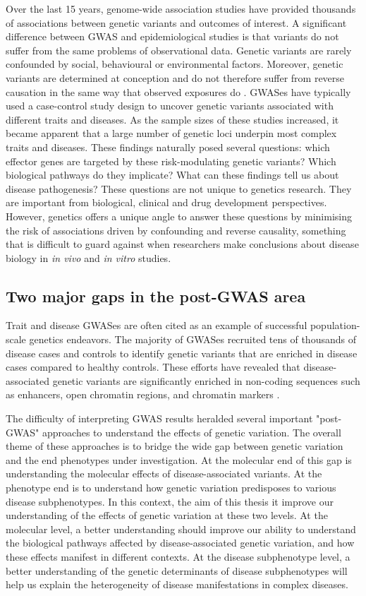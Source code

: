 Over the last 15 years, genome-wide association studies have provided thousands of associations between genetic variants and outcomes of interest. A significant difference between GWAS and epidemiological studies is that variants do not suffer from the same problems of observational data. Genetic variants are rarely confounded by social, behavioural or environmental factors. Moreover, genetic variants are determined at conception and do not therefore suffer from reverse causation in the same way that observed exposures do \cite{Smith2007-py}. GWASes have typically used a case-control study design to uncover genetic variants associated with different traits and diseases. As the sample sizes of these studies increased, it became apparent that a large number of genetic loci underpin most complex traits and diseases. These findings naturally posed several questions: which effector genes are targeted by these risk-modulating genetic variants? Which biological pathways do they implicate? What can these findings tell us about disease pathogenesis? These questions are not unique to genetics research. They are important from biological, clinical and drug development perspectives. However, genetics offers a unique angle to answer these questions by minimising the risk of associations driven by confounding and reverse causality, something that is difficult to guard against when researchers make conclusions about disease biology in \textit{in vivo} and \textit{in vitro} studies. 

\subsection{Two major gaps in the post-GWAS area}
Trait and disease GWASes are often cited as an example of successful population-scale genetics endeavors. The majority of GWASes recruited tens of thousands of disease cases and controls to identify genetic variants that are enriched in disease cases compared to healthy controls. These efforts have revealed that disease-associated genetic variants are significantly enriched in non-coding sequences such as enhancers, open chromatin regions, and chromatin markers \cite{Ahonen2009-eo,Degner2012-dq,Trynka2013-qs}. 

The difficulty of interpreting GWAS results heralded several important "post-GWAS" approaches to understand the effects of genetic variation. The overall theme of these approaches is to bridge the wide gap between genetic variation and the end phenotypes under investigation. At the molecular end of this gap is understanding the molecular effects of disease-associated variants. At the phenotype end is to understand how genetic variation predisposes to various disease subphenotypes. In this context, the aim of this thesis it improve our understanding of the effects of genetic variation at these two levels. At the molecular level, a better understanding should improve our ability to understand the biological pathways affected by disease-associated genetic variation, and how these effects manifest in different contexts. At the disease subphenotype level, a better understanding of the genetic determinants of disease subphenotypes will help us explain the heterogeneity of disease manifestations in complex diseases. 

